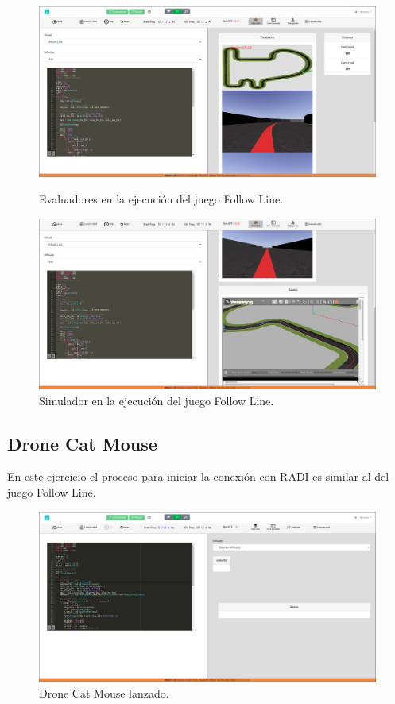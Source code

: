 \documentclass[a4paper, 12pt]{book}
\begin{document}
\begin{figure}[H]
  \centering
  \begin{minipage}[b]{0.8\textwidth}
    \includegraphics[width=\textwidth]{img/fl_sim_1.png}
    \caption{Evaluadores en la ejecución del juego Follow Line.}
    \label{figura:robot_davinci}
  \end{minipage}
  \hfill
  \begin{minipage}[b]{0.8\textwidth}
    \includegraphics[width=\textwidth]{img/fl_sim_2.png}
    \caption{Simulador en la ejecución del juego Follow Line.}
    \label{figura:robot_atrias}
  \end{minipage}
\end{figure}

\subsection{Drone Cat Mouse}

En este ejercicio el proceso para iniciar la conexión con RADI es similar al del juego Follow Line. 

\begin{figure}[H]
	\centering
    \includegraphics[width=12cm]{img/dcm_conectado.png}
    \caption{Drone Cat Mouse lanzado.}
    \label{figura:evaluator_drone}
\end{figure}
\end{document}

